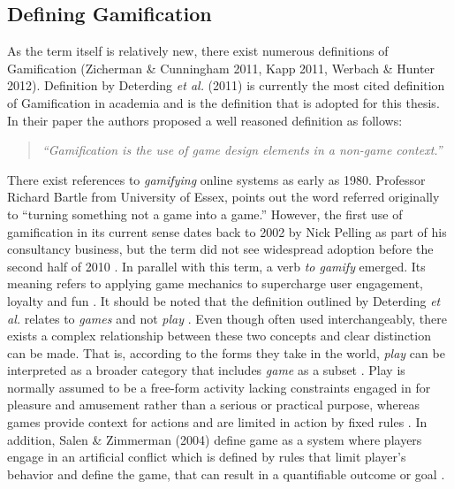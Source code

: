\subsection{Defining Gamification}
As  the  term  itself  is  relatively  new,  there  exist  numerous definitions  of  Gamification  (Zicherman \&  Cunningham 2011, Kapp 2011, Werbach \& Hunter 2012). Definition by Deterding \textit{et al.} (2011) is currently the most cited definition of Gamification in academia and is the definition that is adopted for this thesis. In their paper the authors proposed a well reasoned definition as follows:
\begin{quotation}
\textit{``Gamification is the use of game design elements in a non-game context.''}
\end{quotation}
There exist references to \textit{gamifying} online systems as early as 1980. Professor Richard Bartle from University of Essex, points out the word referred originally to ``turning something not a game into a game.''\cite{werbach2012win}%
However, the first use of gamification in its current sense dates back to 2002 by Nick Pelling as part of his consultancy business, but the term did not see widespread adoption before the second half of 2010 \cite{marczewski2013gamification}. In parallel with this term, a verb \textit{to gamify} emerged. Its meaning refers to applying game mechanics to supercharge user engagement, loyalty and fun \cite{toGamify}. 
It should be noted that the definition outlined by Deterding \textit{et al.} relates to \textit{games} and not \textit{play} \cite{deterding2011game}. %
Even though often used interchangeably, there exists a complex relationship between these two concepts and clear distinction can be made. That is, according to the forms they take in the world, \textit{play} can be interpreted as a broader category that includes \textit{game} as a subset \cite{salen2004rules}. Play is normally assumed to be a free-form activity lacking constraints engaged in for pleasure and amusement rather than a serious or practical purpose, whereas games provide context for actions and are limited in action by fixed rules \cite{juul2011half}. In addition, Salen \& Zimmerman (2004) define game as a system where players engage in an artificial conflict which is defined by rules that limit player's behavior and define the game, that can result in a quantifiable outcome or goal \cite{salen2004rules}. %
